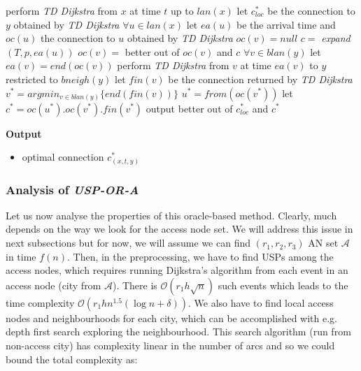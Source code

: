 	\begin{algorithm}                     
		\begin{algorithmic}[1]
			\STATE {}
			\STATE perform \textit{TD Dijkstra} from $x$ at time $t$ up to $lan(x)$
				\STATE let $c_{loc}^{*}$ be the connection to $y$ obtained by \textit{TD Dijkstra} 
			\ENDIF
			\STATE $\forall u \in lan(x)$ let $ea(u)$ be the arrival time and $oc(u)$ the connection to $u$ obtained by \textit{TD Dijkstra}
			\STATE {}
				\STATE $oc(v) = null$
						\STATE $c =$ \textit{expand}$(T, p, ea(u))$
						\STATE $oc(v) =$ better out of $oc(v)$ and $c$
					\ENDFOR
				\ENDFOR
			\ENDFOR
			\STATE $\forall v \in blan(y)$ let $ea(v) = end(oc(v))$
			\STATE {}
				\STATE perform \textit{TD Dijkstra} from $v$ at time $ea(v)$ to $y$ restricted to $bneigh(y)$
				\STATE let $fin(v)$ be the connection returned by \textit{TD Dijkstra}
			\ENDFOR
			\STATE $v^{*} = argmin_{v \in blan(y)} \{end(fin(v))\}$
			\STATE $u^{*} = from(oc(v^{*}))$
			\STATE let $c^{*} = oc(u^{*}) . oc(v^{*}) . fin(v^{*})$ 
			\STATE output better out of $c_{loc}^{*}$ and $c^{*}$
		\end{algorithmic}
		\textbf{Output}
		\begin{itemize}
			\item optimal connection $c_{(x, t, y)}^{*}$
		\end{itemize}
	\end{algorithm}
	\color{black}
	
	\subsubsection{Analysis of \textit{USP-OR-A}}
	
		\noindent Let us now analyse the properties of this oracle-based method. Clearly, much depends on the way we look for the access node set. We will address this issue in next subsections but for now, we will assume we can find $(r_{1}, r_{2}, r_{3})$ AN set $\mathcal{A}$ in time $f(n)$. Then, in the preprocessing, we have to find USPs among the access nodes, which requires running Dijkstra's algorithm from each event in an access node (city from $\mathcal{A}$). There is $\mathcal{O}(r_{1}h\sqrt{n})$ such events which leads to the time complexity $\mathcal{O}(r_{1}hn^{1.5} (\log n + \delta))$. We also have to find local access nodes and neighbourhoods for each city, which can be accomplished with e.g. depth first search exploring the neighbourhood. This search algorithm (run from non-access city) has complexity linear in the number of arcs and so we could bound the total complexity as:
		
